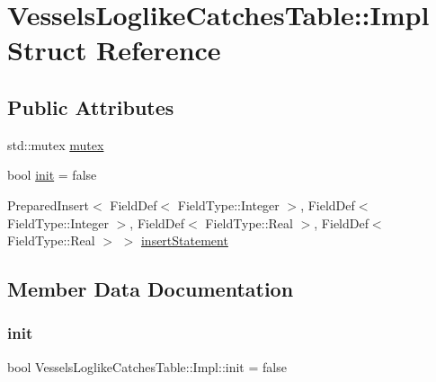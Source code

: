\hypertarget{struct_vessels_loglike_catches_table_1_1_impl}{}\section{Vessels\+Loglike\+Catches\+Table\+::Impl Struct Reference}
\label{struct_vessels_loglike_catches_table_1_1_impl}
\subsection*{Public Attributes}
\begin{DoxyCompactItemize}
\item 
std\+::mutex \mbox{\hyperlink{struct_vessels_loglike_catches_table_1_1_impl_a9d6d9ae14e6b61a400c57273e5b43920}{mutex}}
\item 
bool \mbox{\hyperlink{struct_vessels_loglike_catches_table_1_1_impl_a9205876f6b26632b197f049b48d6d793}{init}} = false
\item 
Prepared\+Insert$<$ Field\+Def$<$ Field\+Type\+::\+Integer $>$, Field\+Def$<$ Field\+Type\+::\+Integer $>$, Field\+Def$<$ Field\+Type\+::\+Real $>$, Field\+Def$<$ Field\+Type\+::\+Real $>$ $>$ \mbox{\hyperlink{struct_vessels_loglike_catches_table_1_1_impl_a6e1f5dba1b41c9efc91adab1da60f75d}{insert\+Statement}}
\end{DoxyCompactItemize}


\subsection{Member Data Documentation}
\mbox{\label{struct_vessels_loglike_catches_table_1_1_impl_a9205876f6b26632b197f049b48d6d793}} 
\subsubsection{\texorpdfstring{init}{init}}
{\footnotesize\ttfamily bool Vessels\+Loglike\+Catches\+Table\+::\+Impl\+::init = false}

\mbox{\label{struct_vessels_loglike_catches_table_1_1_impl_a6e1f5dba1b41c9efc91adab1da60f75d}} 
